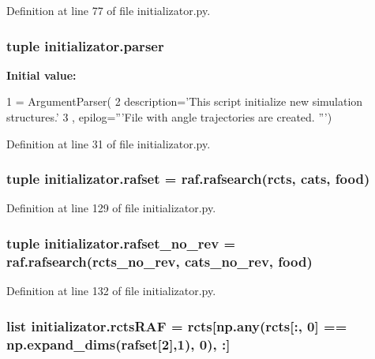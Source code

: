 Definition at line 77 of file initializator.\+py.

\hypertarget{a00137_af2659789ba1896029e3ab9bfbf83d019}{
\subsubsection[{parser}]{\setlength{\rightskip}{0pt plus 5cm}tuple initializator.\+parser}}\label{a00137_af2659789ba1896029e3ab9bfbf83d019}
{\bfseries Initial value\+:}
\begin{DoxyCode}
1 = ArgumentParser(
2                                 description=\textcolor{stringliteral}{'This script initialize new simulation structures.'}
3                                 , epilog=\textcolor{stringliteral}{'''File with angle trajectories are created. '''})
\end{DoxyCode}


Definition at line 31 of file initializator.\+py.

\hypertarget{a00137_a1d1d6b79a11a2c646cdccd86ed33c06e}{
\subsubsection[{rafset}]{\setlength{\rightskip}{0pt plus 5cm}tuple initializator.\+rafset = raf.\+rafsearch(rcts, cats, {\bf food})}}\label{a00137_a1d1d6b79a11a2c646cdccd86ed33c06e}


Definition at line 129 of file initializator.\+py.

\hypertarget{a00137_a233edb9c8bdc6d737256db839206b8eb}{
\subsubsection[{rafset\+\_\+no\+\_\+rev}]{\setlength{\rightskip}{0pt plus 5cm}tuple initializator.\+rafset\+\_\+no\+\_\+rev = raf.\+rafsearch(rcts\+\_\+no\+\_\+rev, cats\+\_\+no\+\_\+rev, {\bf food})}}\label{a00137_a233edb9c8bdc6d737256db839206b8eb}


Definition at line 132 of file initializator.\+py.

\hypertarget{a00137_af3ff3d6a780c5a5522cef529ea028654}{
\subsubsection[{rcts\+R\+A\+F}]{\setlength{\rightskip}{0pt plus 5cm}list initializator.\+rcts\+R\+A\+F = rcts\mbox{[}np.\+any(rcts\mbox{[}\+:, 0\mbox{]} == np.\+expand\+\_\+dims({\bf rafset}\mbox{[}2\mbox{]},1), 0), \+:\mbox{]}}}\label{a00137_af3ff3d6a780c5a5522cef529ea028654}



